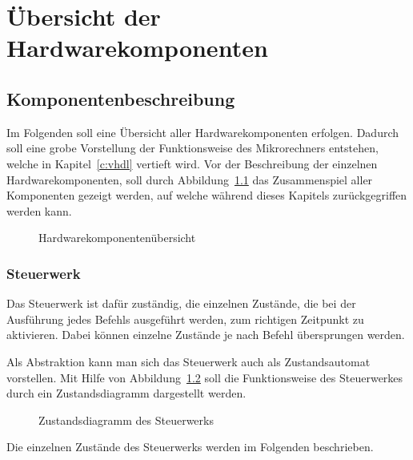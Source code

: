 \chapter{Übersicht der Hardwarekomponenten}
\label{c:hardware}
\section{Komponentenbeschreibung}
Im Folgenden soll eine Übersicht aller Hardwarekomponenten erfolgen. Dadurch
soll eine grobe Vorstellung der Funktionsweise des Mikrorechners entstehen,
welche in Kapitel~\ref{c:vhdl} vertieft wird. Vor der Beschreibung der einzelnen
Hardwarekomponenten, soll durch Abbildung~\ref{pic:hardware_overview} das
Zusammenspiel aller Komponenten gezeigt werden, auf welche während dieses
Kapitels zurückgegriffen werden kann.

\begin{figure}[htb]
\begin{tikzpicture}
\end{tikzpicture}
\caption{Hardwarekomponentenübersicht}
\label{pic:hardware_overview}
\end{figure}
\pagebreak
\subsection{Steuerwerk}
\label{s:control}
Das Steuerwerk ist dafür zuständig, die einzelnen Zustände, die bei der
Ausführung jedes Befehls ausgeführt werden, zum richtigen Zeitpunkt zu
aktivieren. Dabei können einzelne Zustände je nach Befehl übersprungen werden.

Als Abstraktion kann man sich das Steuerwerk auch als Zustandsautomat
vorstellen. Mit Hilfe von Abbildung~\ref{pic:zustandsdiagramm} soll die
Funktionsweise des Steuerwerkes durch ein Zustandsdiagramm dargestellt werden.

\begin{figure}[htb]
\centering
{}
\caption{Zustandsdiagramm des Steuerwerks}
\label{pic:zustandsdiagramm}
\end{figure}
\pagebreak
Die einzelnen Zustände des Steuerwerks werden im Folgenden beschrieben.
